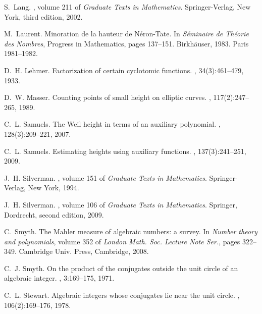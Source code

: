\begin{thebibliography}{10}
S.~Lang.
, volume 211 of {\em Graduate Texts in Mathematics}.
\newblock Springer-Verlag, New York, third edition, 2002.

M.~Laurent.
\newblock Minoration de la hauteur de {N}\'eron-{T}ate.
\newblock In {\em S\'eminaire de Th\'eorie des Nombres}, Progress in
  Mathematics, pages 137--151. Birkh\"auser, 1983.
\newblock Paris 1981--1982.

D.~H. Lehmer.
\newblock Factorization of certain cyclotomic functions.
, 34(3):461--479, 1933.

D.~W. Masser.
\newblock Counting points of small height on elliptic curves.
, 117(2):247--265, 1989.

C.~L. Samuels.
\newblock The {W}eil height in terms of an auxiliary polynomial.
, 128(3):209--221, 2007.

C.~L. Samuels.
\newblock Estimating heights using auxiliary functions.
, 137(3):241--251, 2009.

J.~H. Silverman.
,
  volume 151 of {\em Graduate Texts in Mathematics}.
\newblock Springer-Verlag, New York, 1994.

J.~H. Silverman.
, volume 106 of {\em
  Graduate Texts in Mathematics}.
\newblock Springer, Dordrecht, second edition, 2009.

C.~Smyth.
\newblock The {M}ahler measure of algebraic numbers: a survey.
\newblock In {\em Number theory and polynomials}, volume 352 of {\em London
  Math. Soc. Lecture Note Ser.}, pages 322--349. Cambridge Univ. Press,
  Cambridge, 2008.

C.~J. Smyth.
\newblock On the product of the conjugates outside the unit circle of an
  algebraic integer.
, 3:169--175, 1971.

C.~L. Stewart.
\newblock Algebraic integers whose conjugates lie near the unit circle.
, 106(2):169--176, 1978.

\end{thebibliography}



